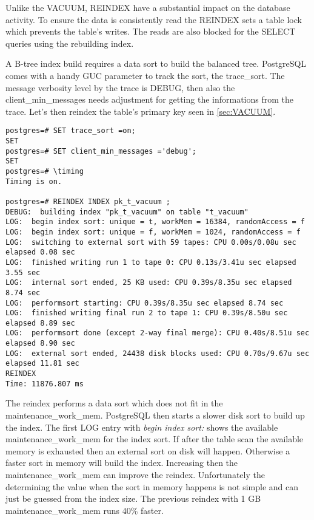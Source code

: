 Unlike the VACUUM, REINDEX have a substantial impact on the database activity. To ensure 
the data is consistently read the REINDEX sets a table lock which prevents the table's writes. The 
reads are also blocked for the SELECT queries using the rebuilding index.\newline

A B-tree index build requires a data sort to build the balanced tree. PostgreSQL comes with a handy 
GUC parameter to track the sort, the trace\_sort. 
The message verbosity level by the trace is DEBUG, then also the client\_min\_messages needs 
adjustment for getting the informations from the trace. Let's then reindex the table's primary key 
seen in \ref{sec:VACUUM}.

\begin{lstlisting}[style=pgsql]
postgres=# SET trace_sort =on;
SET
postgres=# SET client_min_messages ='debug';
SET
postgres=# \timing
Timing is on.

postgres=# REINDEX INDEX pk_t_vacuum ;
DEBUG:  building index "pk_t_vacuum" on table "t_vacuum"
LOG:  begin index sort: unique = t, workMem = 16384, randomAccess = f
LOG:  begin index sort: unique = f, workMem = 1024, randomAccess = f
LOG:  switching to external sort with 59 tapes: CPU 0.00s/0.08u sec elapsed 0.08 sec
LOG:  finished writing run 1 to tape 0: CPU 0.13s/3.41u sec elapsed 3.55 sec
LOG:  internal sort ended, 25 KB used: CPU 0.39s/8.35u sec elapsed 8.74 sec
LOG:  performsort starting: CPU 0.39s/8.35u sec elapsed 8.74 sec
LOG:  finished writing final run 2 to tape 1: CPU 0.39s/8.50u sec elapsed 8.89 sec
LOG:  performsort done (except 2-way final merge): CPU 0.40s/8.51u sec elapsed 8.90 sec
LOG:  external sort ended, 24438 disk blocks used: CPU 0.70s/9.67u sec elapsed 11.81 sec
REINDEX
Time: 11876.807 ms

\end{lstlisting}

The reindex performs a data sort which does not fit in the maintenance\_work\_mem. PostgreSQL then 
starts a slower disk sort to build up the index. The first LOG entry with \textit{begin index 
sort:} shows the available maintenance\_work\_mem for the index sort. If after the table scan the 
available memory is exhausted then an external sort on disk will happen. Otherwise a faster sort in 
memory will build the index. Increasing then the maintenance\_work\_mem  can improve the reindex. 
Unfortunately the determining the value when the sort in memory happens is not simple and can just 
be guessed from the index size. The previous reindex with 1 GB maintenance\_work\_mem runs 40\% 
faster.


